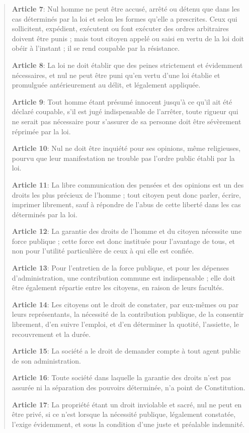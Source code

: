 \documentclass[
  french,
  letterpaper,
  DIV=11,
  numbers=noendperiod]{scrartcl}
\begin{document}
\begin{quote}
\textbf{Article 7}: Nul homme ne peut être accusé, arrêté ou détenu que
dans les cas déterminés par la loi et selon les formes qu'elle a
prescrites. Ceux qui sollicitent, expédient, exécutent ou font exécuter
des ordres arbitraires doivent être punis ; mais tout citoyen appelé ou
saisi en vertu de la loi doit obéir à l'instant ; il se rend coupable
par la résistance.

\textbf{Article 8}: La loi ne doit établir que des peines strictement et
évidemment nécessaires, et nul ne peut être puni qu'en vertu d'une loi
établie et promulguée antérieurement au délit, et légalement appliquée.

\textbf{Article 9}: Tout homme étant présumé innocent jusqu'à ce qu'il
ait été déclaré coupable, s'il est jugé indispensable de l'arrêter,
toute rigueur qui ne serait pas nécessaire pour s'assurer de sa personne
doit être sévèrement réprimée par la loi.

\textbf{Article 10}: Nul ne doit être inquiété pour ses opinions, même
religieuses, pourvu que leur manifestation ne trouble pas l'ordre public
établi par la loi.

\textbf{Article 11}: La libre communication des pensées et des opinions
est un des droits les plus précieux de l'homme ; tout citoyen peut donc
parler, écrire, imprimer librement, sauf à répondre de l'abus de cette
liberté dans les cas déterminés par la loi.

\textbf{Article 12}: La garantie des droits de l'homme et du citoyen
nécessite une force publique ; cette force est donc instituée pour
l'avantage de tous, et non pour l'utilité particulière de ceux à qui
elle est confiée.

\textbf{Article 13}: Pour l'entretien de la force publique, et pour les
dépenses d'administration, une contribution commune est indispensable ;
elle doit être également répartie entre les citoyens, en raison de leurs
facultés.

\textbf{Article 14}: Les citoyens ont le droit de constater, par
eux-mêmes ou par leurs représentants, la nécessité de la contribution
publique, de la consentir librement, d'en suivre l'emploi, et d'en
déterminer la quotité, l'assiette, le recouvrement et la durée.

\textbf{Article 15}: La société a le droit de demander compte à tout
agent public de son administration.

\textbf{Article 16}: Toute société dans laquelle la garantie des droits
n'est pas assurée ni la séparation des pouvoirs déterminée, n'a point de
Constitution.

\textbf{Article 17}: La propriété étant un droit inviolable et sacré,
nul ne peut en être privé, si ce n'est lorsque la nécessité publique,
légalement constatée, l'exige évidemment, et sous la condition d'une
juste et préalable indemnité.
\end{quote}
\end{document}
